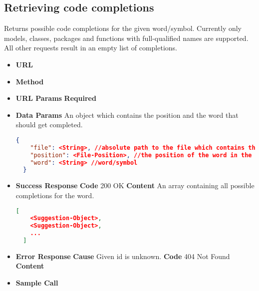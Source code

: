 \subsection{Retrieving code completions}
Returns possible code completions for the given word/symbol.
Currently only models, classes, packages and functions with full-qualified names are supported.
All other requests result in an empty list of completions.
\begin{itemize}
\item \textbf{URL} 
\item \textbf{Method} 

\item \textbf{URL Params}
  \newline\textbf{Required} 

\item \textbf{Data Params} An object which contains the position and the word that should get completed.
  \begin{lstlisting}[basicstyle=\small,language=json]
  {
    "file": <String>, //absolute path to the file which contains the word/symbol
    "position": <File-Position>, //the position of the word in the file
    "word": <String> //word/symbol
  }
  \end{lstlisting}

\item \textbf{Success Response}
  \newline\textbf{Code} 200 OK
  \newline\textbf{Content} An array containing all possible completions for the word.
  \begin{lstlisting}[basicstyle=\small,language=json]
  [
    <Suggestion-Object>,
    <Suggestion-Object>,
    ...
  ]
  \end{lstlisting}

\item \textbf{Error Response}
  \newline\textbf{Cause} Given id is unknown.
  \newline\textbf{Code} 404 Not Found
  \newline\textbf{Content} 

\item \textbf{Sample Call}
\end{itemize}
